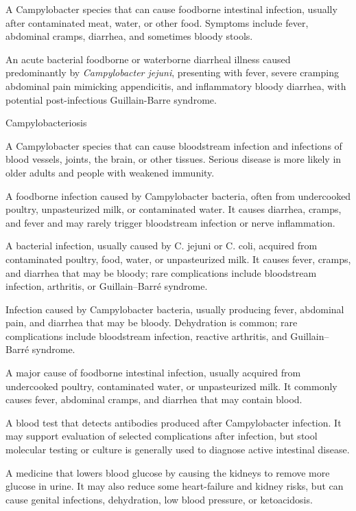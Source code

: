  A Campylobacter species that can cause foodborne intestinal infection, usually after contaminated meat, water, or other food. Symptoms include fever, abdominal cramps, diarrhea, and sometimes bloody stools.

 An acute bacterial foodborne or waterborne diarrheal illness caused predominantly by \textit{Campylobacter jejuni}, presenting with fever, severe cramping abdominal pain mimicking appendicitis, and inflammatory bloody diarrhea, with potential post-infectious Guillain-Barre syndrome.

\synonyms
Campylobacteriosis

 A Campylobacter species that can cause bloodstream infection and infections of blood vessels, joints, the brain, or other tissues. Serious disease is more likely in older adults and people with weakened immunity.

 A foodborne infection caused by Campylobacter bacteria, often from undercooked poultry, unpasteurized milk, or contaminated water. It causes diarrhea, cramps, and fever and may rarely trigger bloodstream infection or nerve inflammation.

 A bacterial infection, usually caused by C. jejuni or C. coli, acquired from contaminated poultry, food, water, or unpasteurized milk. It causes fever, cramps, and diarrhea that may be bloody; rare complications include bloodstream infection, arthritis, or Guillain--Barré syndrome.

 Infection caused by Campylobacter bacteria, usually producing fever, abdominal pain, and diarrhea that may be bloody. Dehydration is common; rare complications include bloodstream infection, reactive arthritis, and Guillain--Barré syndrome.

 A major cause of foodborne intestinal infection, usually acquired from undercooked poultry, contaminated water, or unpasteurized milk. It commonly causes fever, abdominal cramps, and diarrhea that may contain blood.

 A blood test that detects antibodies produced after Campylobacter infection. It may support evaluation of selected complications after infection, but stool molecular testing or culture is generally used to diagnose active intestinal disease.

 A medicine that lowers blood glucose by causing the kidneys to remove more glucose in urine. It may also reduce some heart-failure and kidney risks, but can cause genital infections, dehydration, low blood pressure, or ketoacidosis.


